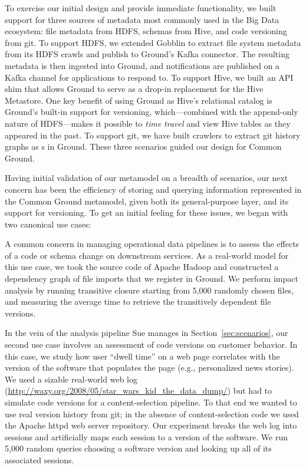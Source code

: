 \documentclass{sig-alternate}
\begin{document}
To exercise our initial design and provide immediate functionality,
we built support for three sources of metadata most commonly used in the Big Data ecosystem: file metadata from HDFS, schemas from Hive, and code versioning from git.
To support HDFS, we extended Gobblin to extract file system metadata from its HDFS crawls and publish to Ground's Kafka connector. The resulting metadata is then ingested into Ground, and notifications are published on a Kafka channel for applications to respond to. To support Hive, we built an API shim that allows Ground to serve as a drop-in replacement for the Hive Metastore.
One key benefit of using Ground as Hive's relational catalog is Ground's built-in support for versioning, which---combined with the append-only nature of HDFS---makes it possible to \emph{time travel} and view Hive tables as they appeared in the past.  To support git, we have built crawlers to extract git history graphs as s in Ground. These three scenarios guided our design for Common Ground.

Having initial validation of our metamodel on a breadth of scenarios, our next concern has been the efficiency of storing and querying information represented in the Common Ground metamodel, given both its general-purpose \modelgraph layer, and its support for versioning. To get an initial feeling for these issues, we began with two canonical use cases:

 A common concern in managing operational data pipelines is to assess the effects of a code or schema change on downstream services.
As a real-world model for this use case, we took the source code of Apache Hadoop and constructed a dependency graph of file imports that we register in Ground.
We perform impact analysis by running transitive closure starting from 5,000 randomly chosen files, and measuring the average time to retrieve the transitively dependent file versions.

 In the vein of the analysis pipeline Sue manages in Section~\ref{sec:scenarios}, our second use case involves an assessment of code versions on customer behavior. 
In this case, we study how user ``dwell time'' on a web page correlates with the version of the software that populates the page (e.g., personalized news stories). 
We used a sizable real-world web log ({\small \url{http://waxy.org/2008/05/star_wars_kid_the_data_dump/}}) %
but had to simulate code versions for a content-selection pipeline. 
To that end we wanted to use real version history from git; in the absence of content-selection code we used the Apache httpd web server repository. 
Our experiment breaks the web log into sessions and artificially maps each session to a version of the software.
We run 5,000 random queries choosing a software version and looking up all of its associated sessions.
\smallitembot
\end{document}

